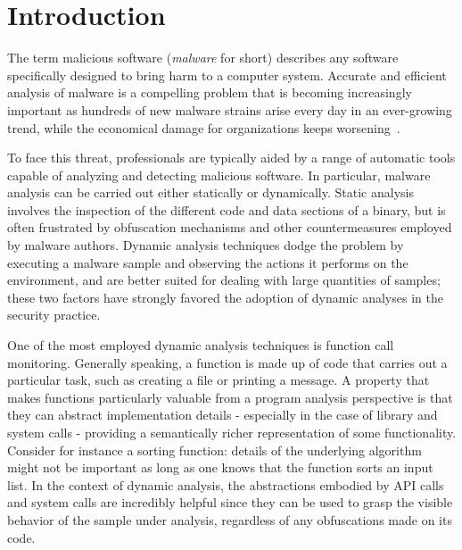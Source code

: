 
\chapter{Introduction} \label{Intro}

\iffalse
Malwares are a threat

Dynamic analysis is favoured over static analysis

One dynamic analysis technique is API hooking/tracing

Malwares are also evasive

Problem: API hooking and tracing evasive samples

Solution BlueTracer
\fi

The term malicious software (\textit{malware} for short) describes any software specifically designed to bring harm to a computer system. Accurate and efficient analysis of malware is a compelling problem that is becoming increasingly important as hundreds of new malware strains arise every day in an ever-growing trend, while the economical damage for organizations keeps worsening~\cite{Cisco}.

To face this threat, professionals are typically aided by a range of automatic tools capable of analyzing and detecting malicious software. In particular, malware analysis can be carried out either statically or dynamically. Static analysis involves the inspection of the different code and data sections of a binary, but is often frustrated by obfuscation mechanisms and other countermeasures employed by malware authors. Dynamic analysis techniques dodge the problem by executing a malware sample and observing the actions it performs on the environment, and are better suited for dealing with large quantities of samples; these two factors have strongly favored the adoption of dynamic analyses in the security practice.

One of the most employed dynamic analysis techniques is function call monitoring. Generally speaking, a function is made up of code that carries out a particular task, such as creating a file or printing a message. A property that makes functions particularly valuable from a program analysis perspective is that they can abstract implementation details - especially in the case of library and system calls - providing a semantically richer representation of some functionality. Consider for instance a sorting function: details of the underlying algorithm might not be important as long as one knows that the function sorts an input list. In the context of dynamic analysis, the abstractions embodied by API calls and system calls are incredibly helpful since they can be used to grasp the visible behavior of the sample under analysis, regardless of any obfuscations made on its code.

